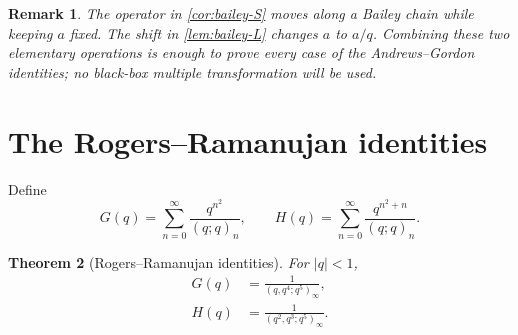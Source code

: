 \documentclass[11pt]{article}
\theoremstyle{blueplain}
\newtheorem{theorem}{Theorem}[section]
\theoremstyle{bluedef}
\newtheorem{remark}[theorem]{Remark}
\begin{document}
\begin{remark}
The operator in \cref{cor:bailey-S} moves along a Bailey chain while keeping $a$ fixed.  The shift in \cref{lem:bailey-L} changes $a$ to $a/q$.  Combining these two elementary operations is enough to prove every case of the Andrews--Gordon identities; no black-box multiple transformation will be used.
\end{remark}

\section{The Rogers--Ramanujan identities}

Define
\begin{equation}\label{eq:GH-def}
G(q)=\sum_{n=0}^{\infty}\frac{q^{n^2}}{(q;q)_n},
\qquad
H(q)=\sum_{n=0}^{\infty}\frac{q^{n^2+n}}{(q;q)_n}.
\end{equation}

\begin{theorem}[Rogers--Ramanujan identities]\label{thm:RR}
For $|q|<1$,
\begin{align}
G(q)&=\frac1{(q,q^4;q^5)_\infty}, \label{eq:RR1}\\
H(q)&=\frac1{(q^2,q^3;q^5)_\infty}. \label{eq:RR2}
\end{align}
\end{theorem}
\end{document}
